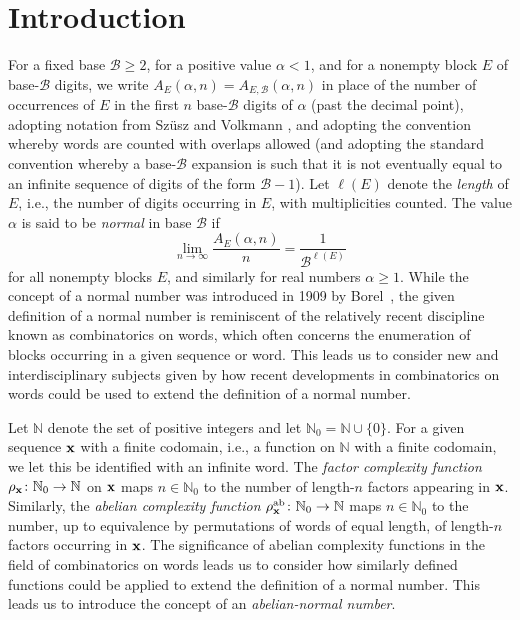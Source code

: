 \documentclass[12pt]{article}
\begin{document}
\section{Introduction}
 For a fixed base $\mathcal{B} \geq 2$, for a positive value $\alpha < 1$, and for a nonempty block $E$ of base-$\mathcal{B}$ digits, we write 
 $A_{E}(\alpha, n) = A_{E, \mathcal{B}}(\alpha, n)$ in place of the number of occurrences of $E$ in the first $n$ base-$\mathcal{B}$ digits
 of $\alpha$ (past the decimal point), adopting notation from Sz\"usz and Volkmann \cite{SzuszVolkmann1994}, and adopting 
 the convention whereby words are counted with 
 overlaps allowed (and adopting the standard convention whereby a base-$\mathcal{B}$ expansion is such that it is 
 not eventually equal to an infinite sequence of digits of the form $\mathcal{B} - 1$). 
 Let $\ell(E)$ denote the \emph{length} of $E$, i.e., the number of digits occurring in $E$, with multiplicities counted. 
 The value $\alpha$ is said to be \emph{normal} in base $\mathcal{B}$ if 
\begin{equation}\label{definitionnormal}
 \lim_{n \to \infty} \frac{A_{E}(\alpha, n)}{n} = \frac{1}{\mathcal{B}^{\ell(E)}} 
\end{equation}
 for all nonempty blocks $E$, and similarly for real numbers $\alpha \geq 1$. 
 While the concept of a normal number was introduced in 1909 by Borel~\cite{Borel1909}, the given definition of a 
 normal number is reminiscent of the relatively recent discipline known as combinatorics on words, which often concerns the enumeration 
 of blocks occurring in a given sequence or word. This leads us to consider new and interdisciplinary subjects given 
 by how recent developments in combinatorics on words could be used to extend the definition of a normal number. 

 Let $\mathbb{N}$ denote the set of positive integers and let $\mathbb{N}_{0} = \mathbb{N} \cup \{ 0 \}$. For a given sequence 
 $\text{{\bf x}}$ with a finite codomain, i.e., a function on $\mathbb{N}$ with a finite codomain, we let this be identified with an infinite 
 word. The \emph{factor complexity function} $\rho_{\text{{\bf x}}}\colon \mathbb{N}_{0} \to \mathbb{N}$ on $\text{{\bf x}}$ maps $n \in 
 \mathbb{N}_{0}$ to the number of length-$n$ factors appearing in $\text{{\bf x}}$. Similarly, the \emph{abelian complexity function} 
 $\rho_{\text{{\bf x}}}^{\operatorname{ab}}\colon \mathbb{N}_{0} \to \mathbb{N}$ maps $n \in \mathbb{N}_{0}$ to the number, up to 
 equivalence by permutations of words of equal length, of length-$n$ factors occurring in $\text{{\bf x}}$. The significance of abelian 
 complexity functions in the field of combinatorics on words leads us to consider how similarly defined functions could be applied to 
 extend the definition of a normal number. This leads us to introduce the concept of an \emph{abelian-normal number}. 
\end{document}
